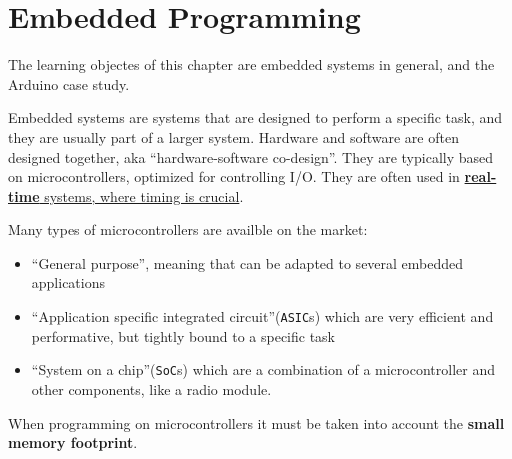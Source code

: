 \chapter{Embedded Programming}
The learning objectes of this chapter are embedded systems in general, and the Arduino case study.

Embedded systems are systems that are designed to perform a specific task, and they are usually part of a larger system.
Hardware and software are often designed together, aka ``hardware-software co-design''.
They are typically based on microcontrollers, optimized for controlling I/O.
They are often used in \ul{\textbf{real-time} systems, where timing is crucial}.

Many types of microcontrollers are availble on the market:
\begin{itemize}
   \item ``General purpose'', meaning that can be adapted to several embedded applications
   \item ``Application specific integrated circuit''(\texttt{ASIC}s) which are very efficient and performative, but tightly bound to a specific task
   \item ``System on a chip''(\texttt{SoC}s) which are a combination of a microcontroller and other components, like a radio module. 
\end{itemize}

When programming on microcontrollers it must be taken into account the \textbf{small memory footprint}.  